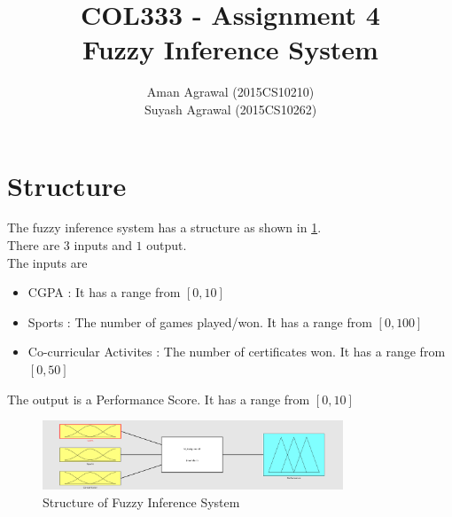 \documentclass{article}
\title{COL333 - Assignment 4\\Fuzzy Inference System}
\author{Aman Agrawal (2015CS10210)\\ Suyash Agrawal (2015CS10262)}
\begin{document}
\maketitle

\section{Structure}

The fuzzy inference system has a structure as shown in \cref{fig:structure}.\\
There are $3$ inputs and $1$ output. \\The inputs are
\begin{itemize}
	\item CGPA : It has a range from $[0,10]$
	\item Sports : The number of games played/won. It has a range from $[0,100]$
	\item Co-curricular Activites : The number of certificates won. It has a range from $[0,50]$
\end{itemize}
The output is a Performance Score. It has a range from $[0,10]$

\begin{figure}[H]
 	\centering
	\includegraphics[width=0.8\textwidth,height=0.3\textheight]{imgs/structure.png}
 	\caption{Structure of Fuzzy Inference System\label{fig:structure}}
	\centering
\end{figure}
\end{document}
